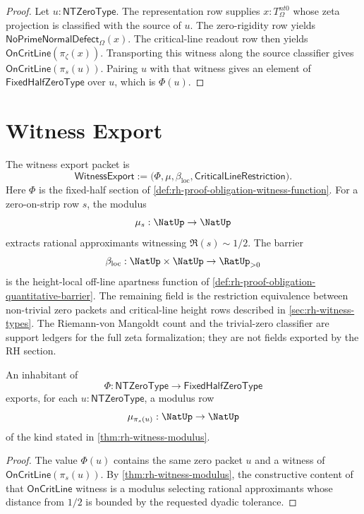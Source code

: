 \begin{proof}
Let $u:\mathsf{NTZeroType}$. The representation row supplies
$x:T_{\Omega}^{nt0}$ whose zeta projection is classified with the source
of $u$. The zero-rigidity row yields
$\mathsf{NoPrimeNormalDefect}_{\Omega}(x)$. The critical-line readout row
then yields $\mathsf{OnCritLine}(\pi_{\zeta}(x))$. Transporting this
witness along the source classifier gives $\mathsf{OnCritLine}(\pi_s(u))$.
Pairing $u$ with that witness gives an element of
$\mathsf{FixedHalfZeroType}$ over $u$, which is $\Phi(u)$.
\end{proof}

\section{Witness Export}
\label{sec:rh-proof-obligation-witness-export}

\begin{definition}
\label{def:rh-proof-obligation-witness-export-packet}
The witness export packet is
$$
\mathsf{WitnessExport}
:=
\bigl(
\Phi,\mu,\beta_{\mathrm{loc}},
\mathsf{CriticalLineRestriction}
\bigr).
$$
Here $\Phi$ is the fixed-half section of
\autoref{def:rh-proof-obligation-witness-function}. For a zero-on-strip
row $s$, the modulus
$$
\mu_s:\NatUp\to\NatUp
$$
extracts rational approximants witnessing $\Re(s)\sim 1/2$. The barrier
$$
\beta_{\mathrm{loc}}:\NatUp\times\NatUp\to\RatUp_{>0}
$$
is the height-local off-line apartness function of
\autoref{def:rh-proof-obligation-quantitative-barrier}. The remaining field
is the restriction equivalence between non-trivial zero packets and
critical-line height rows described in \autoref{sec:rh-witness-types}. The
Riemann-von Mangoldt count and the trivial-zero classifier are support ledgers
for the full zeta formalization; they are not fields exported by the RH section.
\end{definition}

\begin{theorem}
\label{thm:rh-proof-obligation-fixed-half-exports-modulus}
An inhabitant of
$$
\Phi:\mathsf{NTZeroType}\to\mathsf{FixedHalfZeroType}
$$
exports, for each $u:\mathsf{NTZeroType}$, a modulus row
$$
\mu_{\pi_s(u)}:\NatUp\to\NatUp
$$
of the kind stated in \autoref{thm:rh-witness-modulus}.
\end{theorem}

\begin{proof}
The value $\Phi(u)$ contains the same zero packet $u$ and a witness of
$\mathsf{OnCritLine}(\pi_s(u))$. By
\autoref{thm:rh-witness-modulus}, the constructive content of that
$\mathsf{OnCritLine}$ witness is a modulus selecting rational
approximants whose distance from $1/2$ is bounded by the requested
dyadic tolerance.
\end{proof}

